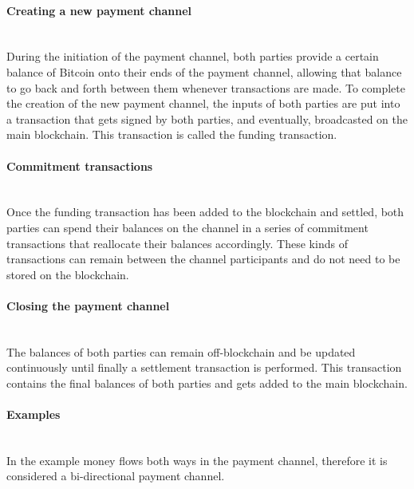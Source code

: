\documentclass[a4paper, 12pt]{report}
\begin{document}
\paragraph{Creating a new payment channel} \hspace{0pt} \\
During the initiation of the payment channel, both parties provide a certain balance of Bitcoin onto their ends of the payment channel, allowing that balance to go back and forth between them whenever transactions are made. To complete the creation of the new payment channel, the inputs of both parties are put into a transaction that gets signed by both parties, and eventually, broadcasted on the main blockchain. This transaction is called the funding transaction.

\paragraph{Commitment transactions} \hspace{0pt} \\
Once the funding transaction has been added to the blockchain and settled, both parties can spend their balances on the channel in a series of commitment transactions that reallocate their balances accordingly. These kinds of transactions can remain between the channel participants and do not need to be stored on the blockchain.

\paragraph{Closing the payment channel} \hspace{0pt} \\
The balances of both parties can remain off-blockchain and be updated continuously until finally a settlement transaction is performed. This transaction contains the final balances of both parties and gets added to the main blockchain.

\paragraph{Examples} \hspace{0pt} \\
In the example money flows both ways in the payment channel, therefore it is considered a bi-directional payment channel.
\end{document}
